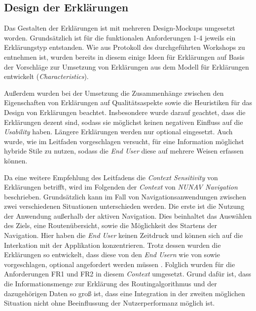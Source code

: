 \subsection{Design der Erklärungen}

Das Gestalten der Erklärungen ist mit mehreren Design-Mockups umgesetzt worden. Grundsätzlich ist für die funktionalen Anforderungen 1-4 jeweils ein Erklärungstyp entstanden. Wie aus Protokoll des durchgeführten Workshops zu entnehmen ist, wurden bereits in diesem einige Ideen für Erklärungen auf Basis der Vorschläge zur Umsetzung von Erklärungen aus dem Modell für Erklärungen entwickelt (\textit{Characteristics}).

Außerdem wurden bei der Umsetzung die Zusammenhänge zwischen den Eigenschaften von Erklärungen auf Qualitätsaspekte sowie die Heuristiken für das Design von Erklärungen beachtet. Insbesondere wurde darauf geachtet, dass die Erklärungen dezent sind, sodass sie möglichst keinen negativen Einfluss auf die \textit{Usability} haben. Längere Erklärungen werden nur optional eingesetzt. Auch wurde, wie im Leitfaden vorgeschlagen versucht, für eine Information möglichst hybride Stile zu nutzen, sodass die \textit{End User} diese auf mehrere Weisen erfassen können.

Da eine weitere Empfehlung des Leitfadens die \textit{Context Sensitivity} von Erklärungen betrifft, wird im Folgenden der \textit{Context} von \textit{NUNAV Navigation} beschrieben.
Grundsätzlich kann im Fall von Navigationsanwendungen zwischen zwei verschiedenen Situationen unterschieden werden. Die erste ist die Nutzung der Anwendung außerhalb der aktiven Navigation. Dies beinhaltet das Auswählen des Ziels, eine Routenübersicht, sowie die Möglichkeit des Startens der Navigation. Hier haben die \textit{End User} keinen Zeitdruck und können sich auf die Interkation mit der Applikation konzentrieren. Trotz dessen wurden die Erklärungen so entwickelt, dass diese von den \textit{End Usern} wie von \citeauthor{chazette_end-users_nodate} sowie \citeauthor{wang_integration_2020} vorgeschlagen, optional angefordert werden müssen \cite{chazette_end-users_nodate,wang_integration_2020}. Folglich wurden für die Anforderungen FR1 und FR2 in diesem \textit{Context} umgesetzt. Grund dafür ist, dass die Informationsmenge zur Erklärung des Routingalgorithmus und der dazugehörigen Daten so groß ist, dass eine Integration in der zweiten möglichen Situation nicht ohne Beeinflussung der Nutzerperformanz möglich ist.

